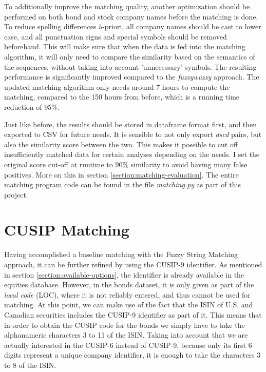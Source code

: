 To additionally improve the matching quality, another optimization should be performed on both bond and stock company names before the matching is done. To reduce spelling differences \`{a}-priori, all company names should be cast to lower case, and all punctuation signs and special symbols should be removed beforehand. This will make sure that when the data is fed into the matching algorithm, it will only need to compare the similarity based on the semantics of the sequences, without taking into account 'unnecessary' symbols. The resulting performance is significantly improved compared to the \textit{fuzzywuzzy} approach. The updated matching algorithm only needs around 7 hours to compute the matching, compared to the 150 hours from before, which is a running time reduction of 95\%. 

Just like before, the results should be stored in dataframe format first, and then exported to CSV for future needs. It is sensible to not only export \textit{dscd} pairs, but also the similarity score between the two. This makes it possible to cut off insufficiently matched data for certain analyses depending on the needs. I set the original score cut-off at runtime to 90\% similarity to avoid having many false positives. More on this in section \ref{section:matching-evaluation}. The entire matching program code can be found in the file \textit{matching.py} as part of this project. 

\section{CUSIP Matching} \label{section:cusip-matching}
Having accomplished a baseline matching with the Fuzzy String Matching approach, it can be further refined by using the CUSIP-9 identifier. As mentioned in section \ref{section:available-options}, the identifier is already available in the equities database. However, in the bonds dataset, it is only given as part of the \textit{local code} (LOC), where it is not reliably entered, and thus cannot be used for matching. At this point, we can make use of the fact that the ISIN of U.S. and Canadian securities includes the CUSIP-9 identifier as part of it. This means that in order to obtain the CUSIP code for the bonds we simply have to take the alphanumeric characters 3 to 11 of the ISIN. Taking into account that we are actually interested in the CUSIP-6 instead of CUSIP-9, because only its first 6 digits represent a unique company identifier, it is enough to take the characters 3 to 8 of the ISIN. 

